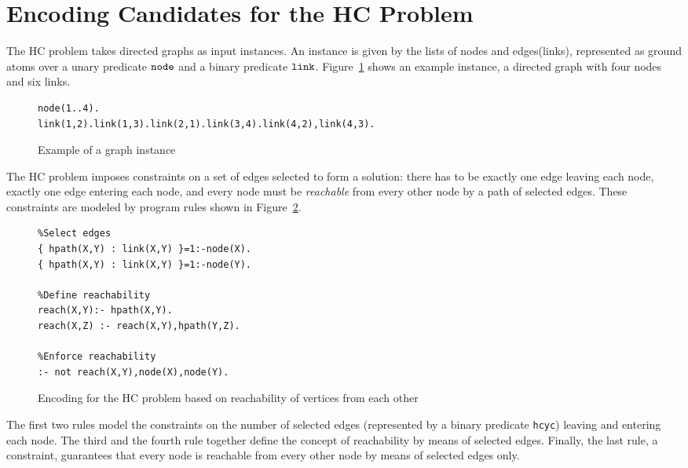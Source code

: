\documentclass{new_tlp}
\begin{document}
\section{Encoding Candidates for the HC Problem}
%
The HC problem takes directed graphs as input instances. An instance is given 
by the lists of nodes and edges(links), represented as ground atoms over a unary 
predicate $\tt{node}$ and a binary predicate $\tt{link}$. Figure~\ref{graphinstance} shows
an example instance, a directed graph with four nodes and six links.

\begin{figure}
\figrule
\begin{center}
\begin{verbatim}
node(1..4).
link(1,2).link(1,3).link(2,1).link(3,4).link(4,2),link(4,3).
\end{verbatim}
\end{center}
\caption{Example of a graph instance}\label{graphinstance}
\figrule
\end{figure}

The HC problem imposes constraints on a set of edges selected to form a 
solution: there has to be exactly one edge leaving each node, exactly one edge
entering each node, and every node must be \emph{reachable} from every other 
node by a path of selected edges. These constraints are modeled by program
rules shown in Figure~\ref{reachencod}.

\begin{figure}
\figrule
\begin{center}
\begin{verbatim}
%Select edges
{ hpath(X,Y) : link(X,Y) }=1:-node(X).
{ hpath(X,Y) : link(X,Y) }=1:-node(Y).

%Define reachability
reach(X,Y):- hpath(X,Y).
reach(X,Z) :- reach(X,Y),hpath(Y,Z).

%Enforce reachability
:- not reach(X,Y),node(X),node(Y).
\end{verbatim}
\end{center}
\caption{Encoding for the HC problem based on reachability of vertices from
each other}\label{reachencod}
\figrule
\end{figure}

The first two rules model the constraints on the number of selected edges 
(represented by a binary predicate {\tt hcyc}) leaving and entering each node. 
The third and the fourth rule together define the concept of reachability by 
means of selected edges. Finally, the last rule, a constraint, guarantees that
every node is reachable from every other node by means of selected edges only.
\end{document}

